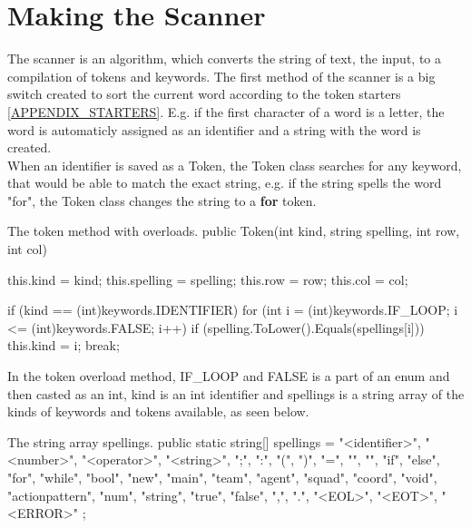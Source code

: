 \section{Making the Scanner}
The scanner is an algorithm, which converts the string of text, the input, to a compilation of tokens and keywords. The first method of the scanner is a big switch created to sort the current word according to the token starters \ref{APPENDIX_STARTERS}. E.g. if the first character of a word is a letter, the word is automaticly assigned as an identifier and a string with the word is created.\\
When an identifier is saved as a Token, the Token class searches for any keyword, that would be able to match the exact string, e.g. if the string spells the word "for", the Token class changes the string to a \textbf{for} token.\\

\begin{source}{}{The token method with overloads.}{}
public Token(int kind, string spelling, int row, int col)
        {
            this.kind = kind;
            this.spelling = spelling;
            this.row = row;
            this.col = col;

            if (kind == (int)keywords.IDENTIFIER)
            {
                for (int i = (int)keywords.IF_LOOP; i <= (int)keywords.FALSE; i++)
                {
                    if (spelling.ToLower().Equals(spellings[i]))
                    {
                        this.kind = i;
                        break;
                    }
                }
            }
        }
\end{source}
In the token overload method, IF\_LOOP and FALSE is a part of an enum and then casted as an int, kind is an int identifier and spellings is a string array of the kinds of keywords and tokens available, as seen below.

\begin{source}{}{The string array spellings.}{}
public static string[] spellings = 
        {
            "<identifier>", "<number>", "<operator>", "<string>", ";", ":", "(", ")", "=", "{", "}", 
            "if", "else", "for", "while", "bool", "new", "main", "team", "agent", "squad", "coord", "void", 
            "actionpattern", "num", "string", "true", "false", ",", ".", "<EOL>", "<EOT>", "<ERROR>"                         
        };
\end{source}

